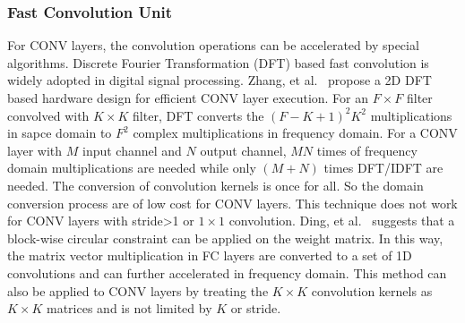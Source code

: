 


\subsubsection{Fast Convolution Unit}
For CONV layers, the convolution operations can be accelerated by special algorithms. Discrete Fourier Transformation (DFT) based fast convolution is widely adopted in digital signal processing. Zhang, et al.~\cite{zhang2017frequency} propose a 2D DFT based hardware design for efficient CONV layer execution. For an $F\times F$ filter convolved with $K\times K$ filter, DFT converts the $(F-K+1)^2K^2$ multiplications in sapce domain to $F^2$ complex multiplications in frequency domain. For a CONV layer with $M$ input channel and $N$ output channel, $MN$ times of frequency domain multiplications are needed while only $(M+N)$ times DFT/IDFT are needed. The conversion of convolution kernels is once for all. So the domain conversion process are of low cost for CONV layers. This technique does not work for CONV layers with stride>1 or $1\times 1$ convolution. Ding, et al.~\cite{ding2017c} suggests that a block-wise circular constraint can be applied on the weight matrix. In this way, the matrix vector multiplication in FC layers are converted to a set of 1D convolutions and can further accelerated in frequency domain. This method can also be applied to CONV layers by treating the $K\times K$ convolution kernels as $K\times K$ matrices and is not limited by $K$ or stride.


